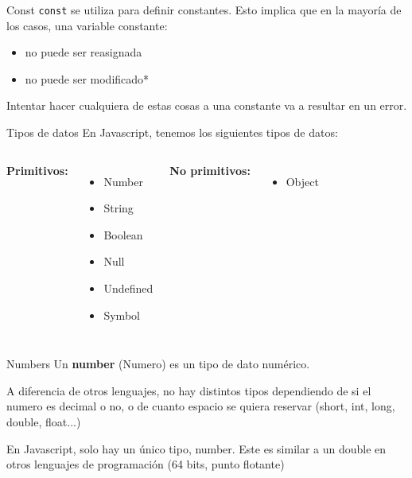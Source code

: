 \documentclass{beamer}
\begin{document}
\begin{frame}[fragile]{Const}
{\verb|const|} se utiliza para definir constantes. Esto implica que en la mayoría de los casos, una variable constante:
\begin{itemize}
    \item no puede ser reasignada
    \item no puede ser modificado*
\end{itemize}

Intentar hacer cualquiera de estas cosas a una constante va a resultar en un error.
\end{frame}

\begin{frame}{Tipos de datos}
En Javascript, tenemos los siguientes tipos de datos:\bigskip

\begin{columns}[t, onlytextwidth]
                \textbf{Primitivos:}
                \begin{itemize}
                    \item Number
                    \item String
                    \item Boolean
                    \item Null
                    \item Undefined
                    \item Symbol
                \end{itemize}
            
                \textbf{No primitivos:}
                \begin{itemize}
                    \item Object
                \end{itemize}
        \end{columns}
\end{frame}

\begin{frame}{Numbers}
Un \textbf{number} (Numero) es un tipo de dato numérico.

A diferencia de otros lenguajes, no hay distintos tipos dependiendo de si el numero es decimal o no, o de cuanto espacio se quiera reservar (short, int, long, double, float...)

En Javascript, solo hay un único tipo, number. Este es similar a un double en otros lenguajes de programación (64 bits, punto flotante)
\end{frame}
\end{document}
